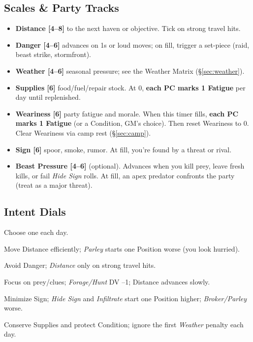 \documentclass[11pt]{article}
\begin{document}
\subsection{Scales \& Party Tracks}
\begin{itemize}
  \item \textbf{Distance [4--8]} to the next haven or objective. Tick on strong travel hits.
  \item \textbf{Danger [4--6]} advances on 1s or loud moves; on fill, trigger a set-piece (raid, beast strike, stormfront).
  \item \textbf{Weather [4--6]} seasonal pressure; see the Weather Matrix (\S\ref{sec:weather}).
  \item \textbf{Supplies [6]} food/fuel/repair stock. At 0, \textbf{each PC marks 1 Fatigue} per day until replenished.
  \item \textbf{Weariness [6]} party fatigue and morale. When this timer fills, \textbf{each PC marks 1 Fatigue} (or a Condition, GM's choice). Then reset Weariness to 0. Clear Weariness via camp rest (\S\ref{sec:camp}).
  \item \textbf{Sign [6]} spoor, smoke, rumor. At fill, you're found by a threat or rival.
  \item \textbf{Beast Pressure [4--6]} (optional). Advances when you kill prey, leave fresh kills, or fail \emph{Hide Sign} rolls. At fill, an apex predator confronts the party (treat as a major threat).
\end{itemize}

\subsection{Intent Dials}\label{sec:intents}
Choose one each day.
\begin{description}[leftmargin=1.2em]
  \item[Traverse] Move Distance efficiently; \emph{Parley} starts one Position worse (you look hurried).
  \item[Scout] Avoid Danger; \emph{Distance} only on strong travel hits.
  \item[Hunt] Focus on prey/clues; \emph{Forage/Hunt} DV --1; Distance advances slowly.
  \item[Hide] Minimize Sign; \emph{Hide Sign} and \emph{Infiltrate} start one Position higher; \emph{Broker/Parley} worse.
  \item[Endure] Conserve Supplies and protect Condition; ignore the first \emph{Weather} penalty each day.
\end{description}
\end{document}

